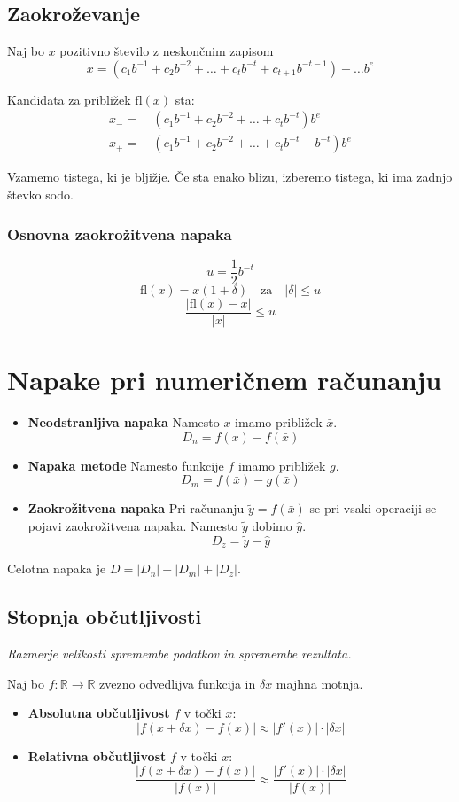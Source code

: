 \begin{multicols}{5}
\subsection{Zaokroževanje}
Naj bo $x$ pozitivno število z neskončnim zapisom
\[ x = (c_1 b^{-1} + c_2 b^{-2} + \dots + c_t b^{-t} + c_{t+1} b^{-t-1})  + \dots b^e \]

Kandidata za približek $\text{fl}(x)$ sta:
\begin{align*}
	x_- =&\ (c_1 b^{-1} + c_2 b^{-2} + \dots + c_t b^{-t}) b^e \\
	x_+ =&\ (c_1 b^{-1} + c_2 b^{-2} + \dots + c_t b^{-t} + b^{-t}) b^e
\end{align*}

Vzamemo tistega, ki je bljižje. Če sta enako blizu, izberemo tistega, ki ima zadnjo števko sodo.

\subsubsection{Osnovna zaokrožitvena napaka}
\[ u = \frac{1}{2} b^{-t} \]
\[ \text{fl}(x) = x(1+\delta) \quad \text{za} \quad |\delta| \leq u \]
\[ \frac{|\text{fl}(x) - x|}{|x|} \leq u\]

\section{Napake pri numeričnem računanju}
\begin{itemize}
	\item \textbf{Neodstranljiva napaka} Namesto $x$ imamo približek $\bar{x}$.
	\[ D_n = f(x) - f(\bar{x}) \]
	\item \textbf{Napaka metode} Namesto funkcije $f$ imamo približek $g$.
	\[ D_m = f(\bar{x}) - g(\bar{x})\]
	\item \textbf{Zaokrožitvena napaka} Pri računanju $\tilde{y} = f(\bar{x})$ se pri vsaki operaciji se pojavi zaokrožitvena napaka. Namesto $\tilde{y}$ dobimo $\hat{y}$.
	\[ D_z = \tilde{y} - \hat{y}\]
\end{itemize}

Celotna napaka je $D = |D_n| + |D_m| + |D_z|$.

\subsection{Stopnja občutljivosti}
\textit{Razmerje velikosti spremembe podatkov in spremembe rezultata.}

Naj bo $f: \mathbb{R} \to \mathbb{R}$ zvezno odvedlijva funkcija in $\delta x$ majhna motnja.
\begin{itemize}
	\item \textbf{Absolutna občutljivost} $f$ v točki $x$:
	\[ | f(x + \delta x) - f(x) | \approx |f'(x)| \cdot |\delta x| \]
	\item \textbf{Relativna občutljivost} $f$ v točki $x$:
	\[ \frac{| f(x + \delta x) - f(x) |}{|f(x)|} \approx \frac{|f'(x)| \cdot |\delta x|}{|f(x)|} \]
\end{itemize}


\end{multicols}
